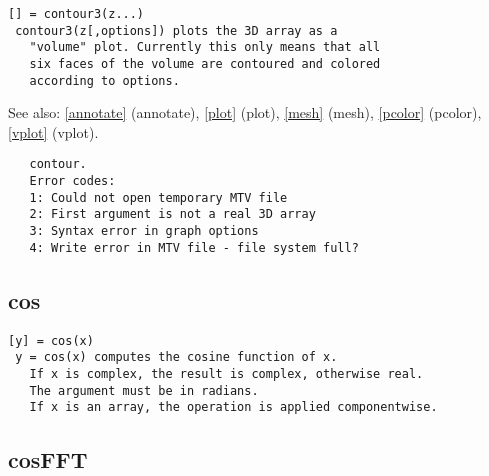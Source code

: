 \documentclass[a4paper]{article}
\begin{document}
\begin{tscreen}
\begin{verbatim}
[] = contour3(z...)
 contour3(z[,options]) plots the 3D array as a
   "volume" plot. Currently this only means that all
   six faces of the volume are contoured and colored
   according to options.
\end{verbatim}

See also: \ref{annotate} {(annotate)}, \ref{plot} {(plot)}, \ref{mesh} {(mesh)}, \ref{pcolor} {(pcolor)}, \ref{vplot} {(vplot)}.
\begin{verbatim}
   contour.
   Error codes:
   1: Could not open temporary MTV file
   2: First argument is not a real 3D array
   3: Syntax error in graph options
   4: Write error in MTV file - file system full? 
\end{verbatim}
\end{tscreen}





\subsection{cos\label{cos}}

\begin{tscreen}
\begin{verbatim}
[y] = cos(x)
 y = cos(x) computes the cosine function of x.
   If x is complex, the result is complex, otherwise real.
   The argument must be in radians.
   If x is an array, the operation is applied componentwise.
\end{verbatim}
\end{tscreen}





\subsection{cosFFT\label{cosFFT}}
\end{document}
